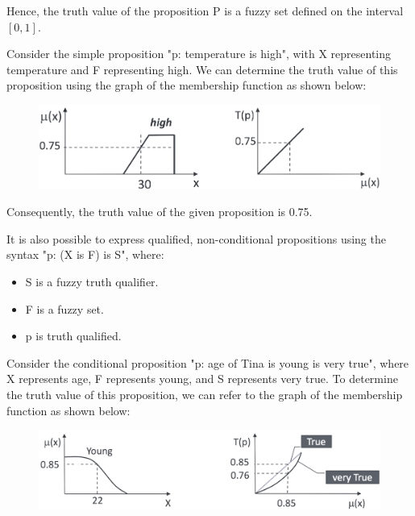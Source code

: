 Hence, the truth value of the proposition P is a fuzzy set defined on the interval $[0,1]$.
\begin{example}
    Consider the simple proposition "p: temperature is high", with X representing temperature and F representing high. 
    We can determine the truth value of this proposition using the graph of the membership function as shown below:        
    \begin{figure}[H]
        \centering
        \includegraphics[width=0.5\linewidth]{images/temperature.png}
    \end{figure}
    Consequently, the truth value of the given proposition is 0.75.
\end{example}

It is also possible to express qualified, non-conditional propositions using the syntax "p: (X is F) is S", where:
\begin{itemize}
    \item S is a fuzzy truth qualifier.
    \item F is a fuzzy set.
    \item p is truth qualified.
\end{itemize}
\begin{example}
    Consider the conditional proposition "p: age of Tina is young is very true", where X represents age, F represents young, and S represents very true. 
    To determine the truth value of this proposition, we can refer to the graph of the membership function as shown below:
    \begin{figure}[H]
        \centering
        \includegraphics[width=0.75\linewidth]{images/age.png}
    \end{figure}
\end{example}

